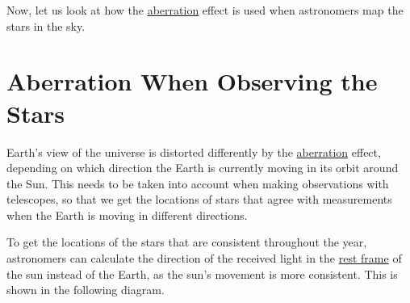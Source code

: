 Now, let us look at how the \hyperlink{def-aberration}{aberration} effect is used when astronomers map the stars in the sky.

\section{Aberration When Observing the Stars}\label{sect: Aberration When Observing the Stars}

Earth's view of the universe is distorted differently by the \hyperlink{def-aberration}{aberration} effect, depending on which direction the Earth is currently moving in its orbit around the Sun.
This needs to be taken into account when making observations with telescopes, so that we get the locations of stars that agree with measurements when the Earth is moving in different directions.

To get the locations of the stars that are consistent throughout the year, astronomers can calculate the direction of the received light in the \hyperlink{def-proper-frame}{rest frame} of the sun instead of the Earth, as the sun's movement is more consistent.
This is shown in the following diagram.

